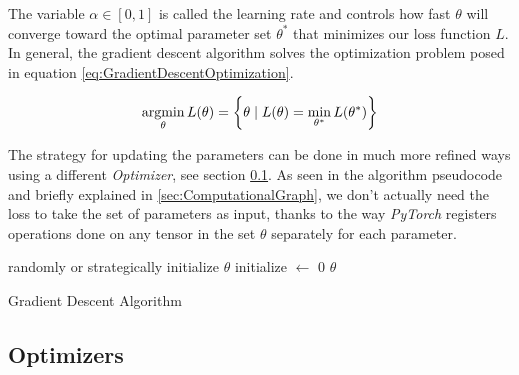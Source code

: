 The variable $\alpha \in [0,1]$ is called the learning rate and controls how fast $\theta$ will converge toward the optimal parameter set $\theta^*$ that minimizes our loss function $L$. In general, the gradient descent algorithm solves the optimization problem posed in equation \ref{eq:GradientDescentOptimization}.

\begin{equation}\label{eq:GradientDescentOptimization}
    \operatorname*{argmin}_{\theta} L(\theta) = \left\{\theta \mid L(\theta) = \min_{\theta^*} L(\theta^*)\right\}
\end{equation}


The strategy for updating the parameters can be done in much more refined ways using a different \textit{Optimizer}, see section \ref{sec:Optimizer}.  As seen in the algorithm pseudocode and briefly explained in \ref{sec:ComputationalGraph}, we don't actually need the loss to take the set of parameters as input, thanks to the way \textit{PyTorch} registers operations done on any tensor in the set $\theta$ separately for each parameter. 




\begin{algorithm}[H]


\BlankLine
randomly or strategically initialize $\theta$\;
initialize \Iter $\leftarrow$ $0$\;
\Return $\theta$\;
\caption{Gradient Descent Algorithm}\label{alg:GradientDescent}
\end{algorithm}


\subsection{Optimizers}\label{sec:Optimizer}

